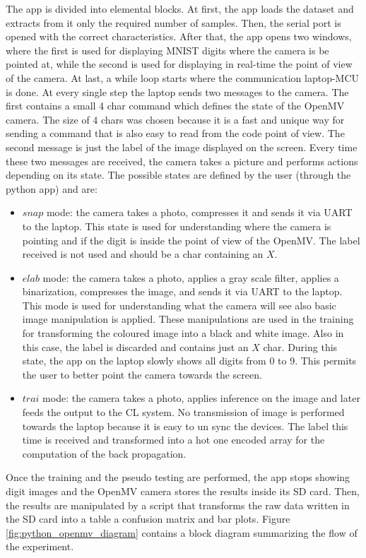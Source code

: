 \documentclass[12pt]{report}
\begin{document}
The app is divided into elemental blocks. At first, the app loads the dataset and extracts from it only the required number of samples. Then, the serial port is opened with the correct characteristics. After that, the app opens two windows, where the first is used for displaying MNIST digits where the camera is be pointed at, while the second is used for displaying in real-time the point of view of the camera. At last, a while loop starts where the communication laptop-MCU is done. At every single step the laptop sends two messages to the camera. The first contains a small 4 char command which defines the state of the OpenMV camera. The size of 4 chars was chosen because it is a fast and unique way for sending a command that is also easy to read from the code point of view. The second message is just the label of the image displayed on the screen. Every time these two messages are received, the camera takes a picture and performs actions depending on its state. The possible states are defined by the user (through the python app) and are: 

\begin{itemize}
	\item $snap$ mode: the camera takes a photo, compresses it and sends it via UART to the laptop. This state is used for understanding where the camera is pointing and if the digit is inside the point of view of the OpenMV. The label received is not used and should be a char containing an $X$.
	\item $elab$ mode: the camera takes a photo, applies a gray scale filter, applies a binarization, compresses the image, and sends it via UART to the laptop. This mode is used for understanding what the camera will see also basic image manipulation is applied. These manipulations are used in the training for transforming the coloured image into a black and white image. Also in this case, the label is discarded and contains just an $X$ char. During this state, the app on the laptop slowly shows all digits from 0 to 9. This permits the user to better point the camera towards the screen.
	\item $trai$ mode: the camera takes a photo, applies inference on the image and later feeds the output to the CL system. No transmission of image is performed towards the laptop because it is easy to un sync the devices. The label this time is received and transformed into a hot one encoded array for the computation of the back propagation.
\end{itemize}

Once the training and the pseudo testing are performed, the app stops showing digit images and the OpenMV camera stores the results inside its SD card. Then, the results are manipulated by a script that transforms the raw data written in the SD card into a table a confusion matrix and bar plots. Figure \ref{fig:python_openmv_diagram} contains a block diagram summarizing the flow of the experiment. 
\end{document}
